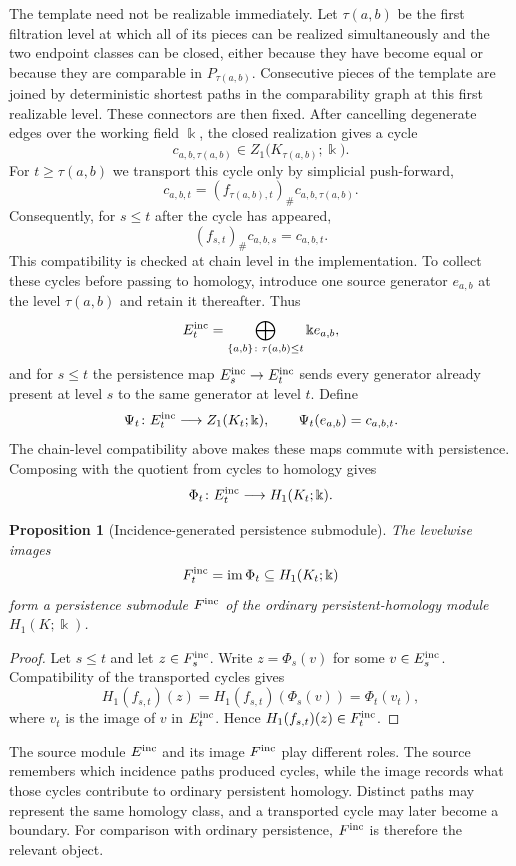 \documentclass[a4paper,11pt]{article}
\newtheorem{proposition}[proposition]{Proposition}
\theoremstyle{definition}
\theoremstyle{remark}
\begin{document}
The template need not be realizable immediately. Let $\tau(a,b)$ be the first filtration level at which all of its pieces can be realized simultaneously and the two endpoint classes can be closed, either because they have become equal or because they are comparable in $P_{\tau(a,b)}$. Consecutive pieces of the template are joined by deterministic shortest paths in the comparability graph at this first realizable level. These connectors are then fixed. After cancelling degenerate edges over the working field $\Bbbk$, the closed realization gives a cycle
$$
c_{a,b,\tau(a,b)}\in Z_1\bigl(K_{\tau(a,b)};\Bbbk\bigr).
$$
For $t\geq\tau(a,b)$ we transport this cycle only by simplicial push-forward,
$$
c_{a,b,t}=(f_{\tau(a,b),t})_\#c_{a,b,\tau(a,b)}.
$$
Consequently, for $s\leq t$ after the cycle has appeared,
$$
(f_{s,t})_\#c_{a,b,s}=c_{a,b,t}.
$$
This compatibility is checked at chain level in the implementation. To collect these cycles before passing to homology, introduce one source generator $e_{a,b}$ at the level $\tau(a,b)$ and retain it thereafter. Thus
$$
E_t^{\rm inc} = \bigoplus_{\{a,b\}\colon\tau(a,b)\leq t}\Bbbk e_{a,b},
$$
and for $s\leq t$ the persistence map $E_s^{\rm inc}\to E_t^{\rm inc}$ sends every generator already present at level $s$ to the same generator at level $t$. Define
$$
\Psi_t\colon E_t^{\rm inc}\longrightarrow Z_1(K_t;\Bbbk),\qquad \Psi_t(e_{a,b})=c_{a,b,t}.
$$
The chain-level compatibility above makes these maps commute with persistence. Composing with the quotient from cycles to homology gives
$$
\Phi_t\colon E_t^{\rm inc}\longrightarrow H_1(K_t;\Bbbk).
$$

\begin{proposition}[Incidence-generated persistence submodule]
\label{prop:incidence-generated-submodule}
The levelwise images
$$
F_t^{\rm inc}=\operatorname{im}\Phi_t\subseteq H_1(K_t;\Bbbk)
$$
form a persistence submodule $F^{\rm inc}$ of the ordinary persistent-homology module $H_1(K;\Bbbk)$.
\end{proposition}

\begin{proof}
Let $s\leq t$ and let $z\in F_s^{\rm inc}$. Write $z=\Phi_s(v)$ for some $v\in E_s^{\rm inc}$. Compatibility of the transported cycles gives
$$
H_1(f_{s,t})(z) = H_1(f_{s,t})(\Phi_s(v)) = \Phi_t(v_t),
$$
where $v_t$ is the image of $v$ in $E_t^{\rm inc}$.  Hence $H_1(f_{s,t})(z)\in F_t^{\rm inc}$.
\end{proof}

The source module $E^{\rm inc}$ and its image $F^{\rm inc}$ play different roles. The source remembers which incidence paths produced cycles, while the image records what those cycles contribute to ordinary persistent homology. Distinct paths may represent the same homology class, and a transported cycle may later become a boundary. For comparison with ordinary persistence, $F^{\rm inc}$ is therefore the relevant object.
\end{document}
